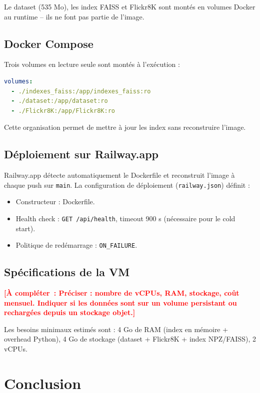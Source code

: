 \documentclass[12pt,a4paper]{report}
\newcommand{\todo}[1]{\textcolor{red}{\textbf{[À compléter~: #1]}}}
\begin{document}
Le dataset (535 Mo), les index FAISS et Flickr8K sont montés en volumes Docker au runtime -- ils ne font pas partie de l'image.

\section{Docker Compose}

Trois volumes en lecture seule sont montés à l'exécution :

\begin{lstlisting}[language=yaml, basicstyle=\ttfamily\footnotesize, frame=single]
volumes:
  - ./indexes_faiss:/app/indexes_faiss:ro
  - ./dataset:/app/dataset:ro
  - ./Flickr8K:/app/Flickr8K:ro
\end{lstlisting}

Cette organisation permet de mettre à jour les index sans reconstruire l'image.

\section{Déploiement sur Railway.app}

Railway.app détecte automatiquement le Dockerfile et reconstruit l'image à chaque push sur \texttt{main}. La configuration de déploiement (\texttt{railway.json}) définit :
\begin{itemize}
  \item Constructeur : Dockerfile.
  \item Health check : \texttt{GET /api/health}, timeout 900 s (nécessaire pour le cold start).
  \item Politique de redémarrage : \texttt{ON\_FAILURE}.
\end{itemize}

\section{Spécifications de la VM}

\todo{Préciser : nombre de vCPUs, RAM, stockage, coût mensuel. Indiquer si les données sont sur un volume persistant ou rechargées depuis un stockage objet.}

Les besoins minimaux estimés sont : 4 Go de RAM (index en mémoire + overhead Python), 4 Go de stockage (dataset + Flickr8K + index NPZ/FAISS), 2 vCPUs.

\chapter*{Conclusion}
\end{document}
